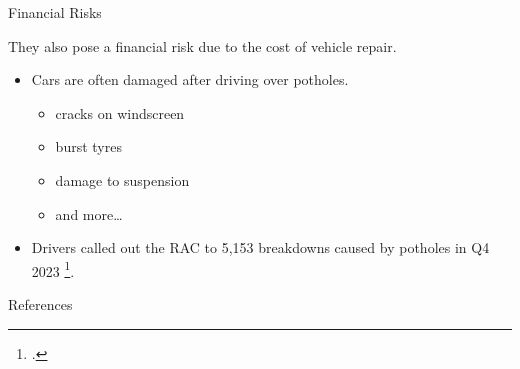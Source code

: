 \documentclass{beamer}
\begin{document}
\begin{frame}{Financial Risks}

    They also pose a \alert{financial} risk due to the cost of vehicle repair.

    \begin{itemize}
        \item Cars are often damaged after driving over potholes.
        \begin{itemize}
            \item cracks on windscreen
            \item burst tyres
            \item damage to suspension
            \item and more…
        \end{itemize}
        \item Drivers called out the RAC to 5,153 breakdowns caused by potholes in Q4 2023 \footcite{car-breakdowns}.
    \end{itemize}

\end{frame}


\begin{frame}{References}
    \printbibliography
\end{frame}
\end{document}
